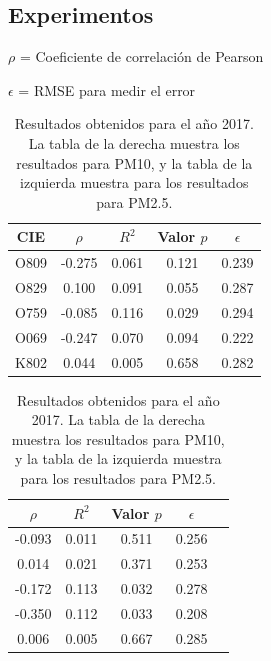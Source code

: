 \documentclass[a0]{sciposter} %
\begin{document}
\begin{multicols}{3}
\section{Experimentos}
$\rho$ = Coeficiente de correlación de Pearson

$\epsilon$ = RMSE para medir el error

\begin{table}[hbt!]
\centering
\captionsetup{type=table}
\setcounter{table}{1}
\caption{Resultados obtenidos para el año 2017. La tabla de la derecha muestra los resultados para PM10, y la tabla de la izquierda muestra para los resultados para PM2.5.}
\label{tab:Resultados obtenidos 2017}
\begin{adjustbox}{width=1\textwidth}
\begin{tabular}{|c|c|c|c|c|}
	\hline
	CIE & $\rho$ & $R^2$ & Valor $p$ & $\epsilon$\\
	\hline
	O809 & -0.275 & 0.061 & 0.121 & 0.239 \\
	\hline
	O829 & 0.100 & 0.091 & 0.055 & 0.287 \\
	\hline
	O759 & -0.085 & 0.116 & 0.029 & 0.294 \\
	\hline
	O069 & -0.247 & 0.070 & 0.094 & 0.222 \\
	\hline
	K802 & 0.044 & 0.005 & 0.658 & 0.282 \\
	\hline
\end{tabular}
\hspace{0.5cm}
\begin{tabular}{|c|c|c|c|c|}
	\hline
	$\rho$ & $R^2$ & Valor $p$ & $\epsilon$\\
	\hline
	-0.093 & 0.011 & 0.511 & 0.256 \\
	\hline
	0.014 & 0.021 & 0.371 & 0.253 \\
	\hline
	-0.172 & 0.113 & 0.032 & 0.278 \\
	\hline
	-0.350 & 0.112 & 0.033 & 0.208 \\
	\hline
	0.006 & 0.005 & 0.667 & 0.285 \\
	\hline
\end{tabular}
\end{adjustbox}
\end{table}


\end{multicols}
\end{document}

